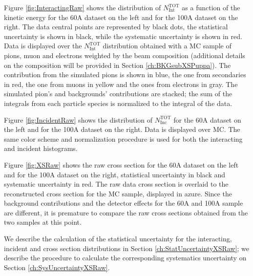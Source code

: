 Figure \ref{fig:InteractingRaw} shows the distribution of  $N^{\text{TOT}}_{\text{Int}}$  as a function of the kinetic energy for the 60A dataset on the left and for the 100A dataset on the right. The data central points are represented by black dots, the statistical uncertainty is shown in black, while the systematic uncertainty is shown in red. Data is displayed over the $N^{\text{TOT}}_{\text{Int}}$  distribution obtained with a MC sample of pions, muon and electrons weighted by the beam composition (additional details on the composition will be provided in Section \ref{ch:BKGsubXSPuppa}). The contribution from the simulated pions is shown in blue, the one from secondaries in red, the one from muons in yellow and the ones from electrons in gray. 
The simulated pion's and backgrounds' contributions are stacked; the sum of the integrals from each particle species is normalized to the integral of the data.
 
Figure \ref{fig:IncidentRaw} shows the distribution of  $N^{\text{TOT}}_{\text{Inc}}$   for the 60A dataset on the left and for the 100A dataset on the right. Data is displayed over MC. The same color scheme and normalization procedure is used for both the interacting and incident histograms. 


Figure \ref{fig:XSRaw} shows the raw cross section for the 60A dataset on the left and for the 100A dataset on the right, statistical uncertainty in black and systematic uncertainty in red. The raw data cross section is overlaid to the reconstructed cross section for the MC sample, displayed in azure. Since the background contributions and the detector effects for the 60A and 100A sample are different, it is premature to compare the raw cross sections obtained from the two samples at this point.

We describe the calculation of the statistical uncertainty for the interacting, incident and cross section distributions in Section \ref{ch:StatUncertaintyXSRaw}; we describe the procedure to calculate the corresponding systematics uncertainty on Section \ref{ch:SysUncertaintyXSRaw}.

